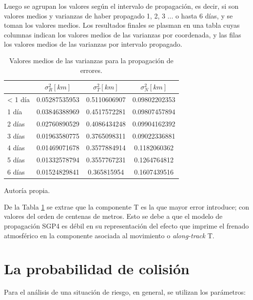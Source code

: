 Luego se agrupan los valores seg\'un el intervalo de propagaci\'on, es decir, si son valores medios y varianzas de haber propagado 1, 2, 3 ... o hasta 6 d\'ias, y se toman los valores medios. Los resultados finales se plasman en una tabla cuyas columnas indican los valores medios de las varianzas por coordenada, y las filas los valores medios de las varianzas por intervalo propagado.\\

\begin{table}[!h]
\caption[Tabla con los valores medios para la propagaci\'on de errores.]{Valores medios de las varianzas para la propagaci\'on de errores. }
\begin{tabular}{l c c c}
\hline \hline
\rowcolor{yellow!35}
&$\sigma^{2}_R [km]$ &$\sigma^{2}_T [km]$ &$\sigma^{2}_N [km]$\\
\hline \hline
< 1 d\'ia & 0.05287535953&0.5110606907&0.09802202353\\

1 d\'ia & 0.03846388969&0.4517572281&0.09807457894\\

2 d\'ias & 0.02760890529&0.4086434248&0.09904162392\\

3 d\'ias & 0.01963580775&0.3765098311&0.09022336881\\

4 d\'ias & 0.01469071678&0.3577884914&0.1182060362\\

5 d\'ias & 0.01332578794&0.3557767231&0.1264764812\\

6 d\'ias & 0.01524829841&0.365815954&0.1607439516\\
\hline
\end{tabular}
\label{tab:resultatabla0}
\begin{flushleft}
\small Autor\'ia propia.
\end{flushleft}
\end{table}

De la Tabla \ref{tab:resultatabla0} se extrae que la componente T es la que mayor error introduce; con valores del orden de centenas de metros. Esto se debe a que el modelo de propagaci\'on SGP4 es d\'ebil en su representaci\'on del efecto que imprime el frenado atmosf\'erico en la componente asociada al movimiento o {\it{along-track}} T. 

\section{La probabilidad de colisi\'on}
Para el an\'alisis de una situaci\'on de riesgo, en general, se utilizan los par\'ametros:\\


